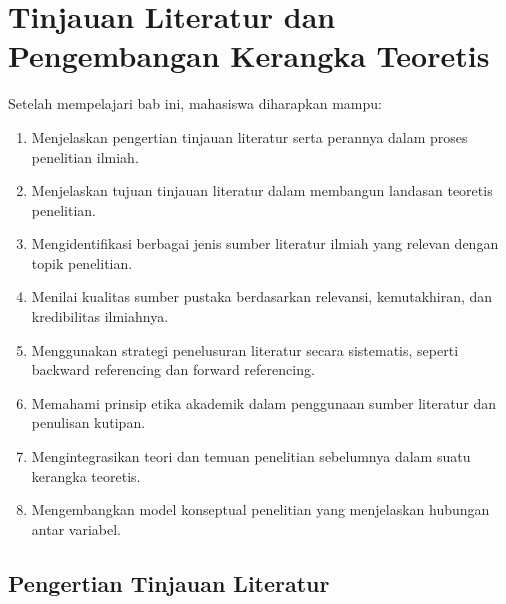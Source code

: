 \documentclass[
  indonesian,
  letterpaper,
  DIV=11,
  numbers=noendperiod]{scrreprt}
\providecommand{\tightlist}{%
  \setlength{\itemsep}{0pt}\setlength{\parskip}{0pt}}
\begin{document}
\chapter{Tinjauan Literatur dan Pengembangan Kerangka
Teoretis}\label{tinjauan-literatur-dan-pengembangan-kerangka-teoretis}

\begin{tcolorbox}[enhanced jigsaw, colframe=quarto-callout-note-color-frame, toptitle=1mm, breakable, leftrule=.75mm, arc=.35mm, toprule=.15mm, colback=white, colbacktitle=quarto-callout-note-color!10!white, bottomtitle=1mm, bottomrule=.15mm, titlerule=0mm, title=\textcolor{quarto-callout-note-color}{\faInfo}\hspace{0.5em}{Capaian Pembelajaran}, coltitle=black, left=2mm, opacitybacktitle=0.6, opacityback=0, rightrule=.15mm]

Setelah mempelajari bab ini, mahasiswa diharapkan mampu:

\begin{enumerate}
\def\labelenumi{\arabic{enumi}.}
\tightlist
\item
  Menjelaskan pengertian tinjauan literatur serta perannya dalam proses
  penelitian ilmiah.
\item
  Menjelaskan tujuan tinjauan literatur dalam membangun landasan
  teoretis penelitian.
\item
  Mengidentifikasi berbagai jenis sumber literatur ilmiah yang relevan
  dengan topik penelitian.
\item
  Menilai kualitas sumber pustaka berdasarkan relevansi, kemutakhiran,
  dan kredibilitas ilmiahnya.
\item
  Menggunakan strategi penelusuran literatur secara sistematis, seperti
  backward referencing dan forward referencing.
\item
  Memahami prinsip etika akademik dalam penggunaan sumber literatur dan
  penulisan kutipan.
\item
  Mengintegrasikan teori dan temuan penelitian sebelumnya dalam suatu
  kerangka teoretis.
\item
  Mengembangkan model konseptual penelitian yang menjelaskan hubungan
  antar variabel.
\end{enumerate}

\end{tcolorbox}

\section{Pengertian Tinjauan
Literatur}\label{pengertian-tinjauan-literatur}
\end{document}

